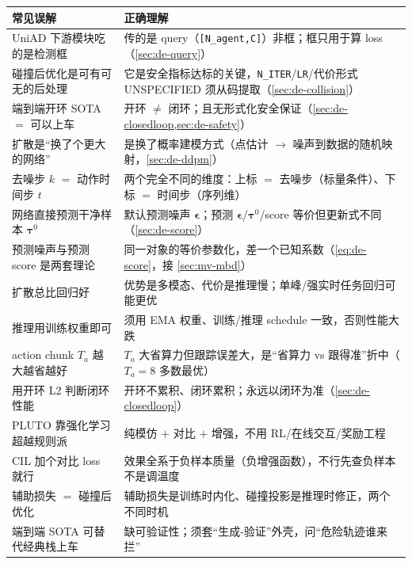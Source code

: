 \begin{table}[H]\centering\small
\begin{tabular}{p{} p{}}
\toprule
\textbf{常见误解} & \textbf{正确理解} \\
\midrule
UniAD 下游模块吃的是检测框 & 传的是 query（\texttt{[N\_agent,C]}）非框；框只用于算 loss（\cref{sec:de-query}）\\
碰撞后优化是可有可无的后处理 & 它是安全指标达标的关键，\texttt{N\_ITER}/\allowbreak\texttt{LR}/代价形式 UNSPECIFIED 须从码提取（\cref{sec:de-collision}）\\
端到端开环 SOTA $=$ 可以上车 & 开环 $\neq$ 闭环；且无形式化安全保证（\cref{sec:de-closedloop,sec:de-safety}）\\
扩散是“换了个更大的网络” & 是换了概率建模方式（点估计 $\to$ 噪声到数据的随机映射，\cref{sec:de-ddpm}）\\
去噪步 $k$ $=$ 动作时间步 $t$ & 两个完全不同的维度：上标 $=$ 去噪步（标量条件）、下标 $=$ 时间步（序列维）\\
网络直接预测干净样本 $\boldsymbol{\tau}^0$ & 默认预测噪声 $\boldsymbol{\epsilon}$；预测 $\boldsymbol{\epsilon}$/$\boldsymbol{\tau}^0$/score 等价但更新式不同（\cref{sec:de-score}）\\
预测噪声与预测 score 是两套理论 & 同一对象的等价参数化，差一个已知系数（\cref{eq:de-score}，接 \cref{sec:mv-mbd}）\\
扩散总比回归好 & 优势是多模态、代价是推理慢；单峰/强实时任务回归可能更优 \\
推理用训练权重即可 & 须用 EMA 权重、训练/推理 schedule 一致，否则性能大跌 \\
action chunk $T_a$ 越大越省越好 & $T_a$ 大省算力但跟踪误差大，是“省算力 vs 跟得准”折中（$T_a=8$ 多数最优）\\
用开环 L2 判断闭环性能 & 开环不累积、闭环累积；永远以闭环为准（\cref{sec:de-closedloop}）\\
PLUTO 靠强化学习超越规则派 & 纯模仿 $+$ 对比 $+$ 增强，不用 RL/在线交互/奖励工程 \\
CIL 加个对比 loss 就行 & 效果全系于负样本质量（负增强函数），不行先查负样本不是调温度 \\
辅助损失 $=$ 碰撞后优化 & 辅助损失是训练时内化、碰撞投影是推理时修正，两个不同时机 \\
端到端 SOTA 可替代经典栈上车 & 缺可验证性；须套“生成-验证”外壳，问“危险轨迹谁来拦”\\
\bottomrule
\end{tabular}
\end{table}

